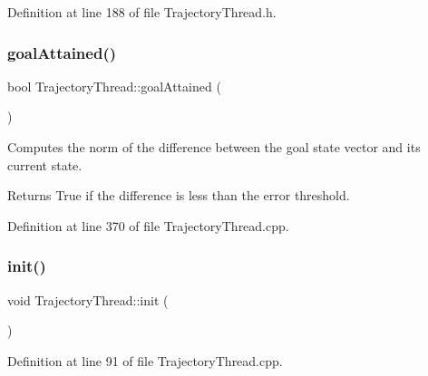 Definition at line 188 of file Trajectory\+Thread.\+h.

\hypertarget{classocra__recipes_1_1TrajectoryThread_acd000c1ffee3b03d2756b04dba583285}{}\label{classocra__recipes_1_1TrajectoryThread_acd000c1ffee3b03d2756b04dba583285} 
\subsubsection{\texorpdfstring{goal\+Attained()}{goalAttained()}}
{\footnotesize\ttfamily bool Trajectory\+Thread\+::goal\+Attained (\begin{DoxyParamCaption}{ }\end{DoxyParamCaption})}

Computes the norm of the difference between the goal state vector and its current state.

\begin{DoxyReturn}{Returns}
True if the difference is less than the error threshold. 
\end{DoxyReturn}


Definition at line 370 of file Trajectory\+Thread.\+cpp.

\hypertarget{classocra__recipes_1_1TrajectoryThread_a55a2e93d3706b500338c70d4e1c406ba}{}\label{classocra__recipes_1_1TrajectoryThread_a55a2e93d3706b500338c70d4e1c406ba} 
\subsubsection{\texorpdfstring{init()}{init()}}
{\footnotesize\ttfamily void Trajectory\+Thread\+::init (\begin{DoxyParamCaption}{ }\end{DoxyParamCaption})\hspace{0.3cm}{\ttfamily [protected]}}



Definition at line 91 of file Trajectory\+Thread.\+cpp.

\hypertarget{classocra__recipes_1_1TrajectoryThread_a5ca19050f1f7f7e396c558b98c9ee8d7}{}\label{classocra__recipes_1_1TrajectoryThread_a5ca19050f1f7f7e396c558b98c9ee8d7} 
